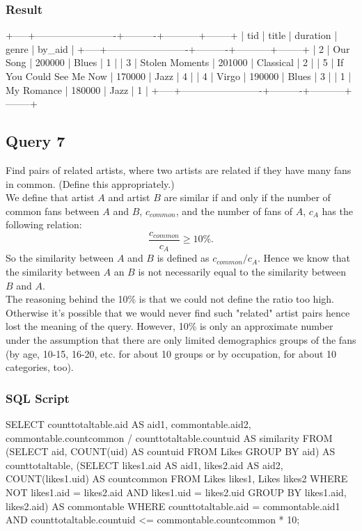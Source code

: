 \documentclass[letterpaper, 12pt]{report}
\begin{document}
	\subsubsection{Result}
	\begin{spverbatim}
		+-----+-------------------------+----------+-----------+--------+
		| tid | title                   | duration | genre     | by_aid |
		+-----+-------------------------+----------+-----------+--------+
		|   2 | Our Song                |   200000 | Blues     |      1 |
		|   3 | Stolen Moments          |   201000 | Classical |      2 |
		|   5 | If You Could See Me Now |   170000 | Jazz      |      4 |
		|   4 | Virgo                   |   190000 | Blues     |      3 |
		|   1 | My Romance              |   180000 | Jazz      |      1 |
		+-----+-------------------------+----------+-----------+--------+
	\end{spverbatim}
	
	\subsection{Query 7}
	Find pairs of related artists, where two artists are related if they have many fans in common. (Define
	this appropriately.)\\
	We define that artist $A$ and artist $B$ are similar if and only if the number of common fans between $A$ and $B$, $c_{common}$, and the number of fans of $A$, $c_A$ has the following relation:
	$$ \frac{c_{common}}{c_A} \geq 10\%.$$
	So the similarity between $A$ and $B$ is defined as $c_{common} / c_A$. Hence we know that the similarity between $A$ an $B$ is not necessarily equal to the similarity between $B$ and $A$.\\
	The reasoning behind the 10\% is that we could not define the ratio too high. Otherwise it's possible that we would never find such "related" artist pairs hence lost the meaning of the query. However, 10\% is only an approximate number under the assumption that there are only limited demographics groups of the fans (by age, 10-15, 16-20, etc. for about 10 groups or by occupation, for about 10 categories, too).
	
	\subsubsection{SQL Script}
	\begin{spverbatim}
		SELECT counttotaltable.aid AS aid1, commontable.aid2,
		commontable.countcommon / counttotaltable.countuid AS similarity
		FROM (SELECT aid, COUNT(uid) AS countuid FROM Likes GROUP BY aid) AS counttotaltable,
		(SELECT likes1.aid AS aid1, likes2.aid AS aid2, COUNT(likes1.uid) AS countcommon
		FROM Likes likes1, Likes likes2
		WHERE NOT likes1.aid = likes2.aid
		AND likes1.uid = likes2.uid
		GROUP BY likes1.aid, likes2.aid) AS commontable
		WHERE counttotaltable.aid = commontable.aid1
		AND counttotaltable.countuid <= commontable.countcommon * 10;
	\end{spverbatim}
\end{document}
